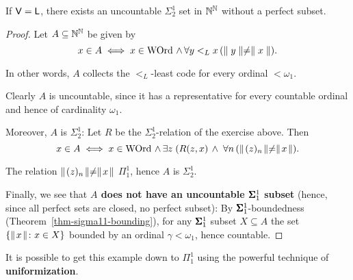 \begin{proposition}\label{prop-sigma12-perfect}If $\mathsf{V=L}$, there exists an uncountable $\Sigma^1_2$ set in $\mathbb{N}^{\mathbb{N}}$ without a perfect subset.

\end{proposition}\begin{proof}Let $A \subseteq \mathbb{N}^{\mathbb{N}}$ be given by
\begin{equation*}
x \in A \iff x \in \operatorname{WOrd} \, \wedge \, \forall y <_L x \,  ( \parallel y \parallel \ne \parallel x \parallel).
\end{equation*}

In other words, $A$ collects the $<_L$-least code for every ordinal $< \omega_1$.

Clearly $A$ is uncountable, since it has a representative for every countable ordinal and hence of cardinality $\omega_1$.

Moreover, $A$ is $\Sigma^1_2$: Let $R$ be the $\Sigma^1_2$-relation of the exercise above. Then
\begin{equation*}
x \in A \iff x \in \operatorname{WOrd} \, \wedge \, \exists z \;(R(z,x) \, \wedge \; \forall n \,  ( \parallel \! (z)_n \!\parallel \neq \parallel \! x \!\parallel).
\end{equation*}

The relation $\parallel \! (z)_n \!\parallel \neq  \parallel \! x \!\parallel$ $\Pi^1_1$, hence $A$ is $\Sigma^1_2$.

Finally, we see that \textbf{$A$ does not have an uncountable $\pmb{\Sigma}^1_1$ subset} (hence, since all perfect sets are closed, no perfect subset): By $\pmb{\Sigma}^1_1$-boundedness (Theorem~\ref{thm-sigma11-bounding}), for any $\pmb{\Sigma}^1_1$ subset $X \subseteq A$ the set $\{ \parallel \! x \!\parallel \colon x \in X\}$ bounded by an ordinal $\gamma < \omega_1$, hence countable.

\end{proof}It is possible to get this example down to $\Pi^1_1$ using the powerful technique of \textbf{uniformization}.

